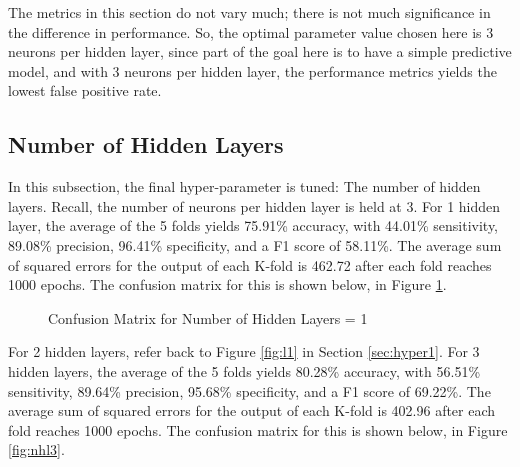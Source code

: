 \documentclass[tikz]{article}
\begin{document}
The metrics in this section do not vary much; there is not much significance in the difference in performance. So, the optimal parameter value chosen here is 3 neurons per hidden layer, since part of the goal here is to have a simple predictive model, and with 3 neurons per hidden layer, the performance metrics yields the lowest false positive rate.

\subsection{Number of Hidden Layers}
\label{sec:hyper3}
In this subsection, the final hyper-parameter is tuned: The number of hidden layers. Recall, the number of neurons per hidden layer is held at 3. For 1 hidden layer, the average of the 5 folds yields 75.91\% accuracy, with 44.01\% sensitivity, 89.08\% precision, 96.41\% specificity, and a F1 score of 58.11\%. The average sum of squared errors for the output of each K-fold is 462.72 after each fold reaches 1000 epochs. The confusion matrix for this is shown below, in Figure \ref{fig:nhl1}.

\begin{figure}[H]
\begin{center}
\caption{Confusion Matrix for Number of Hidden Layers = 1}
\label{fig:nhl1}
\end{center}
\end{figure}

For 2 hidden layers, refer back to Figure \ref{fig:l1} in Section \ref{sec:hyper1}. For 3 hidden layers, the average of the 5 folds yields 80.28\% accuracy, with 56.51\% sensitivity, 89.64\% precision, 95.68\% specificity, and a F1 score of 69.22\%. The average sum of squared errors for the output of each K-fold is 402.96 after each fold reaches 1000 epochs. The confusion matrix for this is shown below, in Figure \ref{fig:nhl3}.
\end{document}
